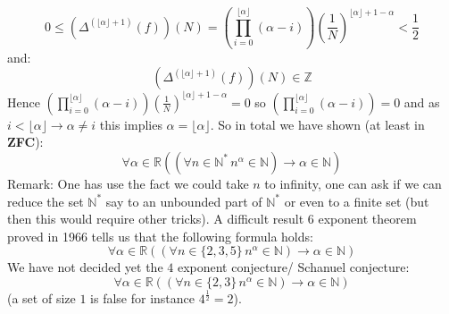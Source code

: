 \documentclass[11pt, a4paper, oneside]{article}
\theoremstyle{remark}
\theoremstyle{lemma}
\begin{document}
$$0\leq (\Delta^{(\lfloor\alpha\rfloor+1)}(f))(N)=\left(\prod_{i=0}^{\lfloor\alpha\rfloor}(\alpha-i)\right)\left(\frac{1}{N}\right)^{\lfloor\alpha\rfloor+1-\alpha}<\frac{1}{2}$$
and:$$(\Delta^{(\lfloor\alpha\rfloor+1)}(f))(N)\in\mathbb{Z}$$
Hence $\left(\prod_{i=0}^{\lfloor\alpha\rfloor}(\alpha-i)\right)\left(\frac{1}{N}\right)^{\lfloor\alpha\rfloor+1-\alpha}=0$ so $\left(\prod_{i=0}^{\lfloor\alpha\rfloor}(\alpha-i)\right)=0$ and as $i<\lfloor\alpha\rfloor\rightarrow \alpha\neq i$ this implies $\alpha=\lfloor\alpha\rfloor$.
So in total we have shown (at least in \textbf{ZFC}):
$$\forall\alpha\in\mathbb{R}\left((\forall n\in\mathbb{N}^{*}\, n^{\alpha}\in\mathbb{N})\rightarrow \alpha\in\mathbb{N}\right)$$
Remark: One has use the fact we could take $n$ to infinity, one can ask if we can reduce the set $\mathbb{N}^{*}$ say to an unbounded part of $\mathbb{N}^{*}$ or even to a finite set (but then this would require other tricks). A difficult result $6$ exponent theorem proved in 1966 tells us that the following formula holds:
$$\forall\alpha\in\mathbb{R}\left((\forall n\in\{2,3,5\}\, n^{\alpha}\in\mathbb{N})\rightarrow \alpha\in\mathbb{N}\right)$$
We have not decided yet the $4$ exponent conjecture/ Schanuel conjecture:
$$\forall\alpha\in\mathbb{R}\left((\forall n\in\{2,3\}\, n^{\alpha}\in\mathbb{N})\rightarrow \alpha\in\mathbb{N}\right)$$
(a set of size $1$ is false for instance $4^{\frac{1}{2}}=2$). \\
\end{document}
